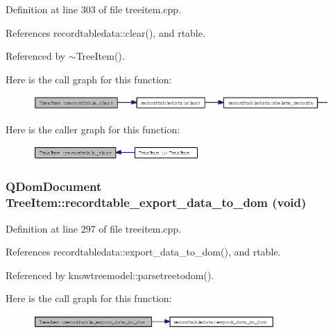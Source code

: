 Definition at line 303 of file treeitem.cpp.

References recordtabledata::clear(), and rtable.

Referenced by $\sim$Tree\-Item().

Here is the call graph for this function:\begin{figure}[H]
\begin{center}
\leavevmode
\includegraphics[width=395pt]{classTreeItem_409019fbc34a4e4bb315904d72ba44ce_cgraph}
\end{center}
\end{figure}


Here is the caller graph for this function:\begin{figure}[H]
\begin{center}
\leavevmode
\includegraphics[width=179pt]{classTreeItem_409019fbc34a4e4bb315904d72ba44ce_icgraph}
\end{center}
\end{figure}
\subsubsection{\setlength{\rightskip}{0pt plus 5cm}QDom\-Document Tree\-Item::recordtable\_\-export\_\-data\_\-to\_\-dom (void)}\label{classTreeItem_0881f776f987c732545d57a4553ed405}




Definition at line 297 of file treeitem.cpp.

References recordtabledata::export\_\-data\_\-to\_\-dom(), and rtable.

Referenced by knowtreemodel::parsetreetodom().

Here is the call graph for this function:\begin{figure}[H]
\begin{center}
\leavevmode
\includegraphics[width=261pt]{classTreeItem_0881f776f987c732545d57a4553ed405_cgraph}
\end{center}
\end{figure}


